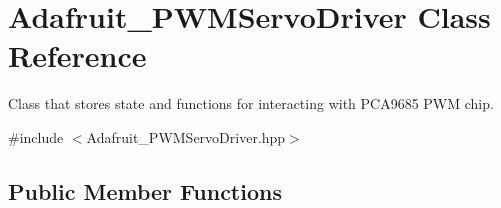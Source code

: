 \hypertarget{classAdafruit__PWMServoDriver}{}\section{Adafruit\+\_\+\+P\+W\+M\+Servo\+Driver Class Reference}
\label{classAdafruit__PWMServoDriver}


Class that stores state and functions for interacting with P\+C\+A9685 P\+WM chip.  




{\ttfamily \#include $<$Adafruit\+\_\+\+P\+W\+M\+Servo\+Driver.\+hpp$>$}

\subsection*{Public Member Functions}
